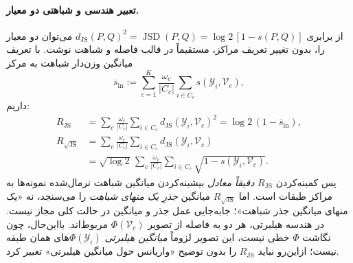 \paragraph{تعبیر هندسی و شباهتی دو معیار.}
از برابری
$d_{\mathrm{JS}}(P,Q)^2
=\operatorname{JSD}(P,Q)
=\log2\,[1-s(P,Q)]$
می‌توان دو معیار را، بدون تغییر تعریف
مراکز، مستقیماً در قالب فاصله و شباهت نوشت.
با تعریف میانگین وزن‌دار شباهت به مرکز
\[
\overline s_{\mathrm{in}}
:=\sum_{c=1}^{K}\frac{\omega_c}{|C_c|}
\sum_{i\in C_c}s(\mathscr Y_i,\mathcal V_c),
\]
داریم:
\begin{equation}\label{eq:ch3-R-JS-similarity-interpretation}
\boxed{
\begin{aligned}
R_{\mathrm{JS}}
&=\sum_c\frac{\omega_c}{|C_c|}
\sum_{i\in C_c}
d_{\mathrm{JS}}(\mathscr Y_i,\mathcal V_c)^2
=\log2\,(1-\overline s_{\mathrm{in}}),\\
R_{\sqrt{\mathrm{JS}}}
&=\sum_c\frac{\omega_c}{|C_c|}
\sum_{i\in C_c}
d_{\mathrm{JS}}(\mathscr Y_i,\mathcal V_c)\\
&=\sqrt{\log2}\,
\sum_c\frac{\omega_c}{|C_c|}
\sum_{i\in C_c}
\sqrt{1-s(\mathscr Y_i,\mathcal V_c)}.
\end{aligned}}
\end{equation}
پس کمینه‌کردن $R_{\mathrm{JS}}$
\emph{دقیقاً معادل} بیشینه‌کردن
میانگین شباهت نرمال‌شده نمونه‌ها
به مراکز طبقات است.
اما $R_{\sqrt{\mathrm{JS}}}$
میانگین \emph{جذرِ یک منهای شباهت}
را می‌سنجد، نه «یک منهای
میانگین جذر شباهت»؛
جابه‌جایی عمل جذر و میانگین
در حالت کلی مجاز نیست.
در هندسه هیلبرتی،
هر دو به فاصله از تصویر
$\Phi(\mathcal V_c)$ مربوط‌اند.
بااین‌حال، چون نگاشت $\Phi$
خطی نیست، این تصویر لزوماً
\emph{میانگین هیلبرتی}
$\Phi(\mathscr Y_i)$های همان طبقه
نیست؛ ازاین‌رو نباید
$R_{\mathrm{JS}}$ را بدون توضیح
«واریانس حول میانگین هیلبرتی»
تعبیر کرد.

